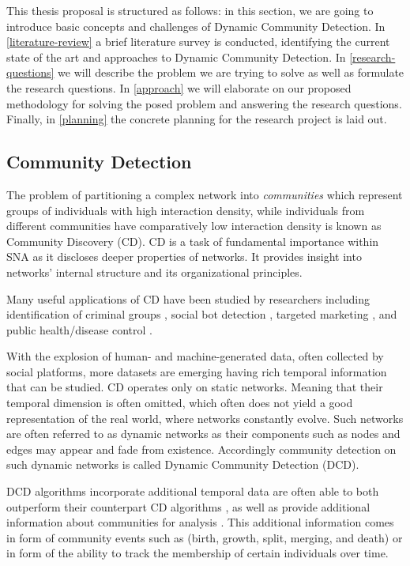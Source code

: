 \documentclass[
acmsmall,
nonacm,
screen,
acmthm]{../../scripts/pandoc/templates/acmart}
\begin{document}
This thesis proposal is structured as follows: in this section, we are
going to introduce basic concepts and challenges of Dynamic Community
Detection. In \cref{literature-review} a brief literature survey is
conducted, identifying the current state of the art and approaches to
Dynamic Community Detection. In \cref{research-questions} we will
describe the problem we are trying to solve as well as formulate the
research questions. In \cref{approach} we will elaborate on our proposed
methodology for solving the posed problem and answering the research
questions. Finally, in \cref{planning} the concrete planning for the
research project is laid out.

\hypertarget{community-detection}{%
\subsection{Community Detection}\label{community-detection}}

The problem of partitioning a complex network into \emph{communities}
which represent groups of individuals with high interaction density,
while individuals from different communities have comparatively low
interaction density is known as Community Discovery (CD). CD is a task
of fundamental importance within SNA as it discloses deeper properties
of networks. It provides insight into networks' internal structure and
its organizational principles.

Many useful applications of CD have been studied by researchers
including identification of criminal groups
\citep{sarvariConstructingAnalyzingCriminal2014}, social bot detection
\citep{karatasReviewSocialBot2017}, targeted marketing
\citep{mosadeghUsingSocialNetwork2011}, and public health/disease
control \citep{salatheDynamicsControlDiseases2010}.

With the explosion of human- and machine-generated data, often collected
by social platforms, more datasets are emerging having rich temporal
information that can be studied. CD operates only on static networks.
Meaning that their temporal dimension is often omitted, which often does
not yield a good representation of the real world, where networks
constantly evolve. Such networks are often referred to as dynamic
networks as their components such as nodes and edges may appear and fade
from existence. Accordingly community detection on such dynamic networks
is called Dynamic Community Detection (DCD).

DCD algorithms incorporate additional temporal data are often able to
both outperform their counterpart CD algorithms
\citep{granellBenchmarkModelAssess2015, liuCommunityDetectionMultiPartite2016, faniUserCommunityDetection2020, rossettiANGELEfficientEffective2020},
as well as provide additional information about communities for analysis
\citep{pallaQuantifyingSocialGroup2007}. This additional information
comes in form of community events such as (birth, growth, split,
merging, and death) or in form of the ability to track the membership of
certain individuals over time.
\end{document}
